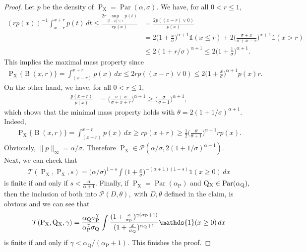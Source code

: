 \documentclass[10pt]{article}
\newcommand{\mP}{\mathcal{P}}
\newcommand{\mT}{\mathcal{T}}
\newcommand{\B}{\operatorname{B}}
\renewcommand{\P}{\operatorname{P}}
\newcommand{\Q}{\operatorname{Q}}
\newcommand{\Par}{\operatorname{Par}}
\newcommand{\sX}{\mathrm{X}}
\begin{document}
\begin{proof}
    Let $p$ be the density of $\P_{\sX} = \Par(\alpha, \sigma).$ We have, for all $ 0 < r \leq 1,$
    \begin{align*}
        (rp(x))^{-1}\int_{x-r}^{x + r}p(t)\, dt \leq \frac{2r\sup_{|t - x| \leq r}p(t)}{rp(x)} &= \frac{2p((x - r)\vee 0)}{p(x)}\\
        &= 2\Big(1 + \frac{x}{\sigma}\Big)^{\alpha + 1}\mathds{1}(x \leq r) + 2\Big(\frac{\sigma + x}{\sigma + x - r}\Big)^{\alpha + 1}\mathds{1}(x > r)\\
        &\leq 2(1 + r/\sigma)^{\alpha + 1} \leq 2\Big(1 + \frac{1}{\sigma}\Big)^{\alpha + 1}.
    \end{align*}
    This implies the maximal mass property since
    \begin{align*}
        \P_{\sX}\{\B(x, r)\} = \int_{(x - r)}^{x + r}p(x)\, dx \leq 2rp((x - r)\vee 0) \leq 2\Big(1 + \frac{x}{\sigma}\Big)^{\alpha + 1}p(x) r.
    \end{align*}
    On the other hand, we have, for all $0 < r \leq 1,$
    \begin{align*}
        \frac{p(x + r)}{p(x)} &= \Big(\frac{\sigma + x}{\sigma + x + r}\Big)^{\alpha + 1} \geq \Big(\frac{\sigma}{\sigma + 1}\Big)^{\alpha + 1},
    \end{align*}
    which shows that the minimal mass property holds with $\theta = 2(1 + 1/\sigma)^{\alpha+1}.$ Indeed,
    \begin{align*}
        \P_{\sX}\{\B(x, r)\} = \int_{(x - r)}^{x + r}p(x)\, dx \geq rp(x + r) \geq \frac{1}{2}\Big(\frac{\theta}{\theta + 1}\Big)^{\alpha +1}rp(x).
    \end{align*}
    Obviously, $\|p\|_{\infty} = \alpha/\sigma.$ Therefore $\P_{\sX} \in \mP(\alpha/\sigma, 2(1 + 1/\sigma)^{\alpha+1}).$\\
    Next, we can check that
    \begin{align*}
        \mT(\P_{\sX}, \P_{\sX}, s) = \big(\alpha/\sigma\big)^{1-s}\int \Big(1 + \frac{x}{\sigma}\Big)^{-(\alpha + 1)(1 - s)}\mathds{1}(x \geq 0)\, dx
    \end{align*}
    is finite if and only if $s < \tfrac{\alpha}{\alpha + 1}.$ Finally, if $\P_{\sX} = \Par(\alpha_{\P})$ and $\Q\mathstrut_{\!\sX} \in \Par(\alpha_{\Q}),$ then the inclusion of both into $\mP(D, \theta),$ with $D, \theta$ defined in the claim, is obvious and we can see that
    \begin{align*}
        \mT(\P_{\sX}, \Q\mathstrut_{\!\sX}, \gamma) = \frac{\alpha_{\Q}\sigma_{\P}^{\gamma}}{\alpha_{\P}^{\gamma}\sigma_{\Q}}\int \frac{(1 + \tfrac{x}{\sigma_{\P}})^{\gamma(\alpha_{\P} + 1)}}{(1 + \tfrac{x}{\sigma_{\Q}})^{\alpha_{\Q} + 1}}\mathds{1}(x \geq 0)\, dx
    \end{align*}
    is finite if and only if $\gamma < \alpha_{\Q}/(\alpha_{\P} + 1).$ This finishes the proof.
\end{proof}
\end{document}
